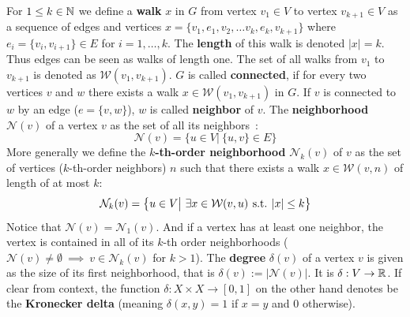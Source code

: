 	For $1\le k\in \mathbb{N}$ we define a \textbf{walk} $x$ in $G$ from vertex $v_1\in V$ to vertex $v_{k+1}\in V$ as a sequence of edges and vertices $x = \{ v_1, e_1, v_2,\allowbreak\dots v_k, e_{k}, v_{k+1} \}$ where $e_i=\{v_i, v_{i+1}\}\in E$ for $i=1,\dots,k$. 
	The \textbf{length} of this walk is denoted $|x|=k$.
	Thus edges can be seen as walks of length one.
	The set of all walks from $v_1$ to $v_{k+1}$ is denoted as $\mathcal{W}(v_1, v_{k+1})$.
	$G$ is called \textbf{connected}, if for every two vertices $v$ and $w$ there exists a walk $x\in\mathcal{W}(v_1, v_{k+1})$ in $G$.
	If $v$ is connected to $w$ by an edge ($e=\{v, w\}$), $w$ is called \textbf{neighbor} of $v$.
	The \textbf{neighborhood} $\mathcal{N}(v)$ of a vertex $v$ as the set of all its neighbors~\cite{2019_Togninalli_NIPS}:
	\[ \mathcal{N}(v) = \{ u\in V | \ \{u,v\}\in E  \} \]
	More generally we define the $k$\textbf{-th-order neighborhood} $\mathcal{N}_k(v)$ of $v$ as the set of vertices ($k$-th-order neighbors) $n$ such that there exists a walk $x\in\mathcal{W}(v,n)$ of length of at most $k$:
	\[ \mathcal{N}_k(v) = \big\{ u\in V \big| \ \exists x\in \mathcal{W}(v, u)\:\st\: |x| \le k  \big\} \]
	Notice that $\mathcal{N}(v) = \mathcal{N}_1(v)$. 
	And if a vertex has at least one neighbor, the vertex is contained in all of its $k$-th order neighborhoods ($\mathcal{N}(v)\neq \emptyset \ \implies \ v\in \mathcal{N}_k(v)$ for $k>1$).
	The \textbf{degree} $\delta(v)$ of a vertex $v$ is given as the size of its first neighborhood, that is $\delta(v):= |\mathcal{N}(v)|$.
	It is $\delta:V\to\mathbb{R}$.
	If clear from context, the function $\delta:X\times X\to[0,1]$ on the other hand denotes be the \textbf{Kronecker delta} (meaning $\delta(x,y)=1$ if $x=y$ and $0$ otherwise).
	
